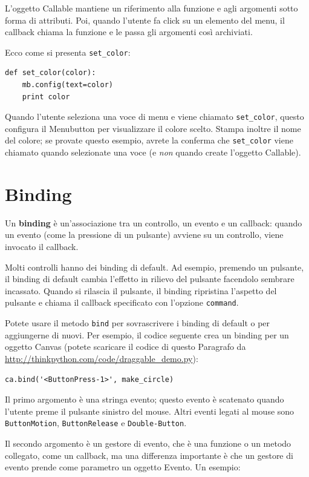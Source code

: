 \documentclass[10pt]{book}
\begin{document}
L'oggetto Callable mantiene un riferimento alla funzione e agli argomenti sotto forma di attributi. Poi, quando l'utente fa click su un elemento del menu, il callback chiama la funzione e le passa gli argomenti così archiviati.

Ecco come si presenta \verb"set_color":

\begin{verbatim}
def set_color(color):
    mb.config(text=color)
    print color
\end{verbatim}
%
Quando l'utente seleziona una voce di menu e viene chiamato \verb"set_color", questo configura il Menubutton per visualizzare il colore scelto. Stampa inoltre il nome del colore; se provate questo esempio, avrete la conferma che
\verb"set_color" viene chiamato quando selezionate una voce (e {\em non} quando create l'oggetto Callable).


\section{Binding}

Un {\bf binding} è un'associazione tra un controllo, un evento e un callback: quando un evento (come la pressione di un pulsante) avviene su un controllo, viene invocato il callback. 

Molti controlli hanno dei binding di default. Ad esempio, premendo un pulsante, il binding di default cambia l'effetto in rilievo del pulsante facendolo sembrare incassato. Quando si rilascia il pulsante, il binding ripristina l'aspetto del pulsante e chiama il callback specificato con l'opzione {\tt command}.

Potete usare il metodo {\tt bind} per sovrascrivere i binding di default o per aggiungerne di nuovi. Per esempio, il codice seguente crea un binding per un oggetto Canvas (potete scaricare il codice di questo Paragrafo da \url{http://thinkpython.com/code/draggable_demo.py}):

\begin{verbatim}
ca.bind('<ButtonPress-1>', make_circle)
\end{verbatim}
%
Il primo argomento è una stringa evento; questo evento è scatenato quando l'utente preme il pulsante sinistro del mouse. Altri eventi legati al mouse sono {\tt ButtonMotion}, {\tt ButtonRelease} e {\tt Double-Button}.

Il secondo argomento è un gestore di evento, che è una funzione o un metodo collegato, come un callback, ma una differenza importante è che un gestore di evento prende come parametro un oggetto Evento. Un esempio:
\end{document}
